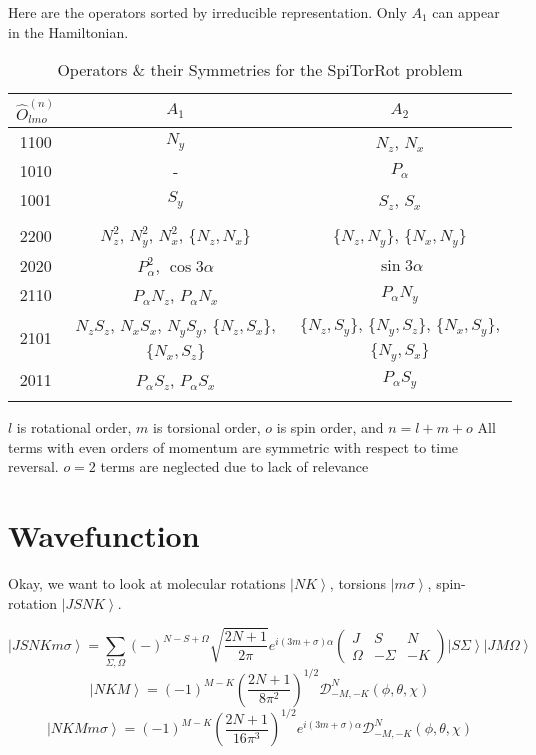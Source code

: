 \documentclass{article}
\begin{document}
Here are the operators sorted by irreducible representation. Only $A_{1}$ can appear in the Hamiltonian.
\begin{table}[H]
 \centering
 \caption{Operators \& their Symmetries for the SpiTorRot problem}
 \begin{tabular}{c|c c}
  $\hat{O}^{(n)}_{lmo}$& $A_{1}$ & $A_{2}$ \\
  \hline
  1100 & $N_{y}$ & $N_{z}$, $N_{x}$ \\
  1010 & - & $P_{\alpha}$ \\
  1001 & $S_{y}$ & $S_{z}$, $S_{x}$ \\
  & &  \\
  2200 & $N_{z}^{2}$, $N_{y}^{2}$, $N_{x}^{2}$, \{$N_{z},N_{x}$\} & \{$N_{z},N_{y}$\}, \{$N_{x},N_{y}$\} \\
  2020 & $P_{\alpha}^{2}$, $\cos3\alpha$ & $\sin3\alpha$\\
  2110 & $P_{\alpha}N_{z}$, $P_{\alpha}N_{x}$ & $P_{\alpha}N_{y}$ \\
  2101 & $N_{z}S_{z}$, $N_{x}S_{x}$, $N_{y}S_{y}$, \{$N_{z},S_{x}$\}, \{$N_{x},S_{z}$\} & \{$N_{z},S_{y}$\}, \{$N_{y},S_{z}$\}, \{$N_{x},S_{y}$\}, \{$N_{y},S_{x}$\} \\
  2011 & $P_{\alpha}S_{z}$, $P_{\alpha}S_{x}$ & $P_{\alpha}S_{y}$ \\
  &  &  \\
  \hline
 \end{tabular}
\end{table}
$l$ is rotational order, $m$ is torsional order, $o$ is spin order, and $n=l+m+o$
All terms with even orders of momentum are symmetric with respect to time reversal. 
$o=2$ terms are neglected due to lack of relevance

\section{Wavefunction}
Okay, we want to look at molecular rotations $\left|NK\right\rangle$, torsions $\left|m\sigma\right\rangle$, spin-rotation $\left|JSNK\right\rangle$.

\begin{equation}
	\left |J S N K m \sigma \right\rangle = \sum_{\Sigma,\Omega}(-)^{N-S+\Omega}\sqrt{\frac{2N+1}{2\pi}}e^{i(3m+\sigma)\alpha}
\begin{pmatrix}
	J & S & N \\
	\Omega & -\Sigma & -K
\end{pmatrix}
\left| S \Sigma \right\rangle \left| J M \Omega\right\rangle
\end{equation}
\begin{equation}
	\left | N K M \right\rangle = (-1)^{M-K} \left(\frac{2N+1}{8\pi^2}\right)^{1/2}\mathscr{D}^N_{-M,-K}(\phi,\theta,\chi)
\end{equation}
\begin{equation}
	\left | N K M m \sigma\right\rangle = (-1)^{M-K} \left(\frac{2N+1}{16\pi^3}\right)^{1/2}e^{i(3m+\sigma)\alpha}\mathscr{D}^N_{-M,-K}(\phi,\theta,\chi)
\end{equation}
\end{document}

